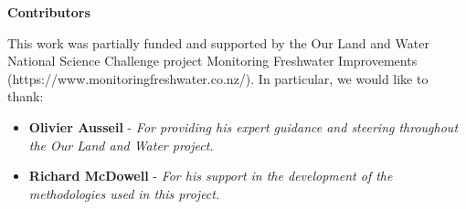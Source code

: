 
\color{ksldarkblue} \LARGE \textbf{Contributors}
\color{black} \normalsize

This work was partially funded and supported by the Our Land and Water National Science Challenge project Monitoring Freshwater Improvements (https://www.monitoringfreshwater.co.nz/). In particular, we would like to thank:
\begin{itemize}
    \item \textbf{Olivier Ausseil} - \textit{For providing his expert guidance and steering throughout the Our Land and Water project.}
    \item \textbf{Richard McDowell} - \textit{For his support in the development of the methodologies used in this project.}
\end{itemize}
